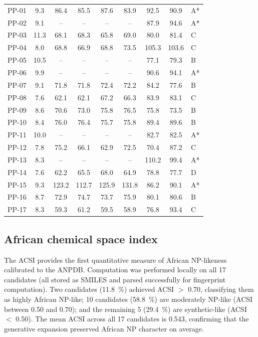 \documentclass[11pt,a4paper]{article}
\begin{document}
\begin{table}[htbp]
\begin{tabularx}{\textwidth}{l S[table-format=1.2] S[table-format=3.1] S[table-format=3.1] S[table-format=3.1] S[table-format=3.1] S[table-format=3.1] S[table-format=3.1] l}
\midrule
PP-01 & 9.3 & 86.4 & 85.5 & 87.6 & 83.9 & 92.5 & 90.9 & A* \\
PP-02 & 9.1 & {--} & {--} & {--} & {--} & 87.9 & 94.6 & A* \\
PP-03 & 11.3 & 68.1 & 68.3 & 65.8 & 69.0 & 80.0 & 81.4 & C \\
PP-04 & 8.0 & 68.8 & 66.9 & 68.8 & 73.5 & 105.3 & 103.6 & C \\
PP-05 & 10.5 & {--} & {--} & {--} & {--} & 77.1 & 79.3 & B \\
PP-06 & 9.9 & {--} & {--} & {--} & {--} & 90.6 & 94.1 & A* \\
PP-07 & 9.1 & 71.8 & 71.8 & 72.4 & 72.2 & 84.2 & 77.6 & B \\
PP-08 & 7.6 & 62.1 & 62.1 & 67.2 & 66.3 & 83.9 & 83.1 & C \\
PP-09 & 8.6 & 70.6 & 73.0 & 75.8 & 76.5 & 75.8 & 73.5 & B \\
PP-10 & 8.4 & 76.0 & 76.4 & 75.7 & 75.8 & 89.4 & 89.6 & B \\
PP-11 & 10.0 & {--} & {--} & {--} & {--} & 82.7 & 82.5 & A* \\
PP-12 & 7.8 & 75.2 & 66.1 & 62.9 & 72.5 & 70.4 & 87.2 & C \\
PP-13 & 8.3 & {--} & {--} & {--} & {--} & 110.2 & 99.4 & A* \\
PP-14 & 7.6 & 62.2 & 65.5 & 68.0 & 64.9 & 78.8 & 77.7 & D \\
PP-15 & 9.3 & 123.2 & 112.7 & 125.9 & 131.8 & 86.2 & 90.1 & A* \\
PP-16 & 8.7 & 72.9 & 74.7 & 73.7 & 75.9 & 80.1 & 80.6 & B \\
PP-17 & 8.3 & 59.3 & 61.2 & 59.5 & 58.9 & 76.8 & 93.4 & C \\
\bottomrule
\end{tabularx}
\end{table}

\subsection{African chemical space index}

The ACSI provides the first quantitative measure of African NP-likeness calibrated to the ANPDB. Computation was performed locally on all \num{17} candidates (all stored as SMILES and parsed successfully for fingerprint computation). Two candidates (\qty{11.8}{\percent}) achieved ACSI $>$ \num{0.70}, classifying them as highly African NP-like; \num{10} candidates (\qty{58.8}{\percent}) are moderately NP-like (ACSI between \num{0.50} and \num{0.70}); and the remaining \num{5} (\qty{29.4}{\percent}) are synthetic-like (ACSI $<$ \num{0.50}). The mean ACSI across all \num{17} candidates is \num{0.543}, confirming that the generative expansion preserved African NP character on average.
\end{document}
